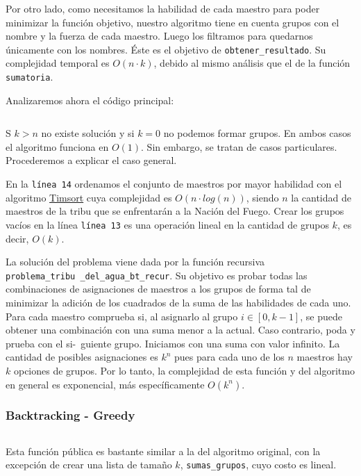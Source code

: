 \documentclass{article}
\begin{document}
Por otro lado, como necesitamos la habilidad de cada maestro para poder minimizar la función objetivo, nuestro algoritmo tiene en cuenta grupos con el nombre y la fuerza de cada maestro. Luego los filtramos para quedarnos únicamente con los nombres. Éste es el objetivo de \texttt{obtener\_resultado}. Su complejidad temporal es $O(n \cdot k)$, debido al mismo análisis que el de la función \texttt{sumatoria}.

Analizaremos ahora el código principal:
\inputminted[linenos, firstline=1, lastline=45]{python}{codigo/backtracking.py}

S $k > n$ no existe solución y si $k = 0$ no podemos formar grupos. En ambos casos el algoritmo funciona en $O(1)$. Sin embargo, se tratan de casos particulares. Procederemos a explicar el caso general.

En la \texttt{línea 14} ordenamos el conjunto de maestros por mayor habilidad con el algoritmo \href{https://svn.python.org/projects/python/trunk/Objects/listsort.txt}{Timsort} cuya complejidad es $O(n \cdot log(n))$, siendo $n$ la cantidad de maestros de la tribu que se enfrentarán a la Nación del Fuego. Crear los grupos vacíos en la línea \texttt{línea 13} es una operación lineal en la cantidad de grupos $k$, es decir, $O(k)$. 

La solución del problema viene dada por la función recursiva \texttt{problema\_tribu\
\_del\_agua\_bt\_recur}. Su objetivo es probar todas las combinaciones de asignaciones de maestros a los grupos de forma tal de minimizar la adición de los cuadrados de la suma de las habilidades de cada uno. Para cada maestro comprueba si, al asignarlo al grupo $i \in [0, k-1]$, se puede obtener una combinación con una suma menor a la actual. Caso contrario, poda y prueba con el si-\ guiente grupo. Iniciamos con una suma con valor infinito. La cantidad de posibles asignaciones es $k^n$ pues para cada uno de los $n$ maestros hay $k$ opciones de grupos. Por lo tanto, la complejidad de esta función y del algoritmo en general es exponencial, más específicamente $O(k^n)$.

\subsubsection{Backtracking - Greedy}
\label{sec:bt-greedy}

\inputminted[linenos, firstline=3, lastline=27]{python}{codigo/backtracking_con_greedy.py}

Esta función pública es bastante similar a la del algoritmo original, con la excepción de crear una lista de tamaño $k$, \texttt{sumas\_grupos}, cuyo costo es lineal.
\end{document}
